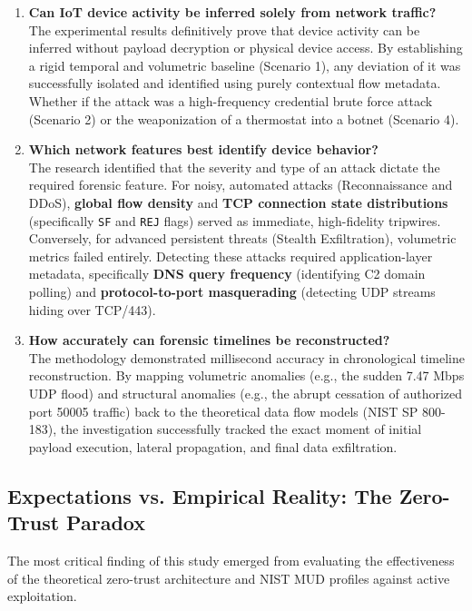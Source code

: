\begin{enumerate}
	\item \textbf{Can IoT device activity be inferred solely from network traffic?} \\
	The experimental results definitively prove that device activity can be inferred without payload decryption or physical device access. By establishing a rigid temporal and volumetric baseline (Scenario 1), any deviation of it was successfully isolated and identified using purely contextual flow metadata. Whether if the attack was a high-frequency credential brute force attack (Scenario 2) or the weaponization of a thermostat into a botnet (Scenario 4).
	
	\item \textbf{Which network features best identify device behavior?} \\
	The research identified that the severity and type of an attack dictate the required forensic feature. For noisy, automated attacks (Reconnaissance and DDoS), \textbf{global flow density} and \textbf{TCP connection state distributions} (specifically \texttt{SF} and \texttt{REJ} flags) served as immediate, high-fidelity tripwires. Conversely, for advanced persistent threats (Stealth Exfiltration), volumetric metrics failed entirely. Detecting these attacks required application-layer metadata, specifically \textbf{DNS query frequency} (identifying C2 domain polling) and \textbf{protocol-to-port masquerading} (detecting UDP streams hiding over TCP/443).
	
	\item \textbf{How accurately can forensic timelines be reconstructed?} \\
	The methodology demonstrated millisecond accuracy in chronological timeline reconstruction. By mapping volumetric anomalies (e.g., the sudden 7.47 Mbps UDP flood) and structural anomalies (e.g., the abrupt cessation of authorized port 50005 traffic) back to the theoretical data flow models (NIST SP 800-183), the investigation successfully tracked the exact moment of initial payload execution, lateral propagation, and final data exfiltration.
\end{enumerate}

\subsection{Expectations vs. Empirical Reality: The Zero-Trust Paradox}

The most critical finding of this study emerged from evaluating the effectiveness of the theoretical zero-trust architecture and NIST MUD profiles against active exploitation.

